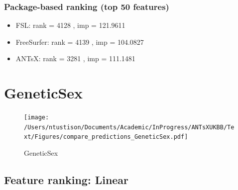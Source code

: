 \documentclass[
  10pt,
]{article}
\begin{document}
\hypertarget{package-based-ranking-top-50-features-5}{%
\subsubsection{Package-based ranking (top 50
features)}\label{package-based-ranking-top-50-features-5}}

\begin{itemize}
\item
  FSL: rank = 4128 , imp = 121.9611
\item
  FreeSurfer: rank = 4139 , imp = 104.0827
\item
  ANTsX: rank = 3281 , imp = 111.1481
\end{itemize}

\clearpage

\hypertarget{geneticsex}{%
\section{GeneticSex}\label{geneticsex}}

\begin{figure}
\centering
\texttt{[image: /Users/ntustison/Documents/Academic/InProgress/ANTsXUKBB/Text/Figures/compare\_predictions\_GeneticSex.pdf]}
\caption{GeneticSex}
\end{figure}

\hypertarget{feature-ranking-linear-6}{%
\subsection{Feature ranking: Linear}\label{feature-ranking-linear-6}}
\end{document}
